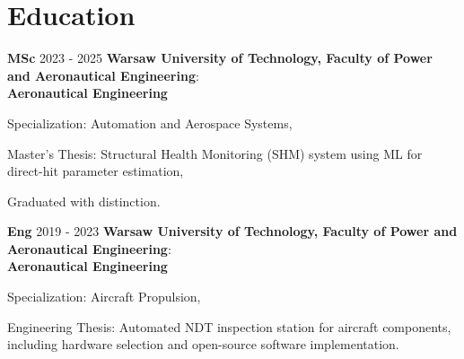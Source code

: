     \newpage
    \section{Education}

    \begin{threecolentry}{\textbf{MSc}}{
        2023 - 2025
    }
        \textbf{Warsaw University of Technology, Faculty of Power and Aeronautical Engineering}: \\ \textbf{Aeronautical Engineering}
        \begin{highlights}
            \item Specialization: Automation and Aerospace Systems,
            \item Master's Thesis: Structural Health Monitoring (SHM) system using ML for direct-hit parameter estimation,
            \item Graduated with distinction.
        \end{highlights}
    \end{threecolentry}

    \vspace{0.3 cm}

    \begin{threecolentry}{\textbf{Eng}}{
        2019 - 2023
    }
        \textbf{Warsaw University of Technology, Faculty of Power and Aeronautical Engineering}: \\ \textbf{Aeronautical Engineering}
        \begin{highlights}
            \item Specialization: Aircraft Propulsion,
            \item Engineering Thesis: Automated NDT inspection station for aircraft components, including hardware selection and open-source software implementation.
        \end{highlights}
    \end{threecolentry}
